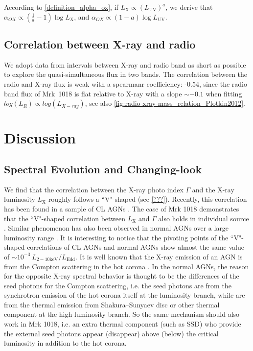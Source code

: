 \documentclass[twocolumn]{aastex63}
\begin{document}
According to \autoref{definition_alpha_ox}, if $ L_\mathrm{X} \propto (L_\mathrm{UV})^{a}$, we derive that $\alpha_{OX}\propto (\frac{1}{a}-1) \log L_\mathrm{X}$, and $\alpha_{OX}\propto (1-a) \log L_\mathrm{UV}$.



\subsection{Correlation between X-ray and radio}\label{subsec:xray-radio}
We adopt data from intervals between X-ray and radio band as short as possible to explore the quasi-simultaneous flux in two bands. The correlation between the radio and X-ray flux is weak with a spearmanr coefficiency: -0.54, since the radio band flux of Mrk~1018 is flat relative to X-ray with a slope $\sim -0.1$ when fitting $log(L_{R})\propto log(L_{X-ray})$, see also \autoref{fig:radio-xray-mass_relation_Plotkin2012}. 






\section{Discussion}\label{sec:discussion}
\subsection{Spectral Evolution and Changing-look}
We find that the correlation between the X-ray photo index $\Gamma$ and the X-ray luminosity $L_\mathrm{X}$ roughly follows a ``V"-shaped (see \autoref{???}). Recently, this correlation has been found in a sample of CL AGNs \citep{Liu2019}. The case of Mrk 1018 demonstrates that the ``V"-shaped correlation between $L_\mathrm{X}$ and $\Gamma$ also holds in individual source \citep[see also in ][]{Liu2019}. Similar phenomenon has also been observed in normal AGNs over a large luminosity range  \citep[e.g. ][]{ Gu2009,Younes2011}. It is interesting to notice that the pivoting points of the ``V"-shaped correlations of CL AGNs and normal AGNs show almost the same value of  $\sim 10^{-3}~L_\mathrm{2-10 keV}/L_\mathrm{Edd}$. It is well known that the X-ray emission of an AGN is from the Compton scattering in the hot corona \citep[e.g.][]{Haardt1991}. In the normal AGNs, the reason for the opposite X-ray spectral behavior is thought to be the differences of the seed photons for the Compton scattering, i.e. the seed photons are from the synchrotron emission of the hot corona itself at the luminosity branch, while are from the thermal emission from Shakura–Sunyaev disc \citep[SSD; e.g. ][]{Qiao2013} or other thermal component \citep{Yang2015} at the high luminosity branch. So the same mechanism should also work in Mrk 1018, i.e. an extra thermal component (such as SSD) who provide the external seed photons appear (disappear) above (below) the critical luminosity in addition to the hot corona. 
\end{document}
